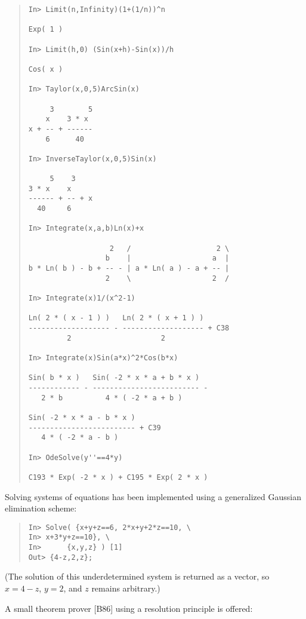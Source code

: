 \documentclass{llncs}
\begin{document}
\begin{quote}\small\begin{verbatim}
In> Limit(n,Infinity)(1+(1/n))^n

Exp( 1 )

In> Limit(h,0) (Sin(x+h)-Sin(x))/h

Cos( x )

In> Taylor(x,0,5)ArcSin(x)

     3        5
    x    3 * x 
x + -- + ------
    6      40  

In> InverseTaylor(x,0,5)Sin(x)

     5    3    
3 * x    x     
------ + -- + x
  40     6     

In> Integrate(x,a,b)Ln(x)+x

                   2   /                    2 \
                  b    |                   a  |
b * Ln( b ) - b + -- - | a * Ln( a ) - a + -- |
                  2    \                   2  /

In> Integrate(x)1/(x^2-1)

Ln( 2 * ( x - 1 ) )   Ln( 2 * ( x + 1 ) )      
------------------- - ------------------- + C38
         2                     2               

In> Integrate(x)Sin(a*x)^2*Cos(b*x)

Sin( b * x )   Sin( -2 * x * a + b * x )   
------------ - ------------------------- - 
   2 * b          4 * ( -2 * a + b )       

Sin( -2 * x * a - b * x )      
------------------------- + C39
   4 * ( -2 * a - b )          

In> OdeSolve(y''==4*y)

C193 * Exp( -2 * x ) + C195 * Exp( 2 * x )
\end{verbatim}\end{quote}

Solving systems of equations has been implemented using a generalized Gaussian
elimination scheme:

\begin{quote}\small\begin{verbatim}
In> Solve( {x+y+z==6, 2*x+y+2*z==10, \ 
In> x+3*y+z==10}, \ 
In>      {x,y,z} ) [1]
Out> {4-z,2,z};
\end{verbatim}\end{quote}
(The solution of this underdetermined system is returned as a vector, so $x = 4 - z$, $y = 2$, and $z$ remains arbitrary.)

A small theorem prover [B86] using a resolution principle is offered:
\end{document}
